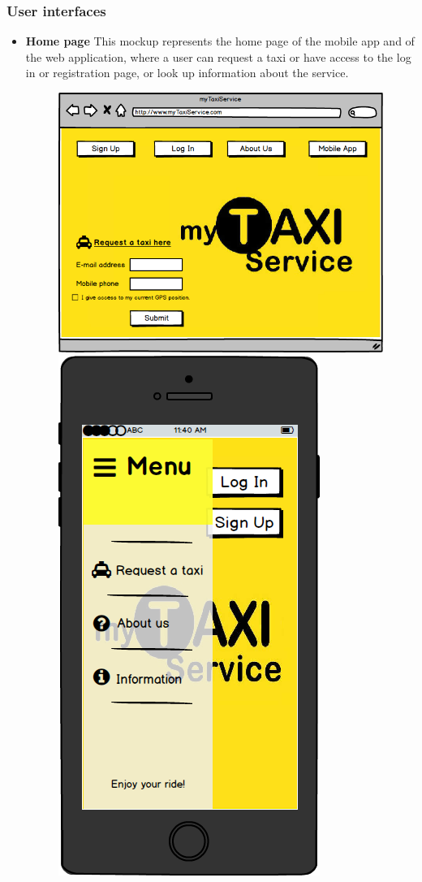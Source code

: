 \documentclass[18pt,oneside,a4paper, titlepage]{article}
\begin{document}
		\subsubsection{User interfaces}
			\begin{itemize}
				\item \textbf{Home page} This mockup represents the home page of the mobile app and of the web application, where a user can request a taxi or have access to the log in or registration page, or look up information about the service.
				\begin{figure}[h]
					\includegraphics[scale=0.3]{Mockups/WebAppHomepage.png}%
					\qquad\qquad
					\includegraphics[scale=0.3]{Mockups/MobileAppHomepage.png}
				

\end{figure}
\end{itemize}
\end{document}
